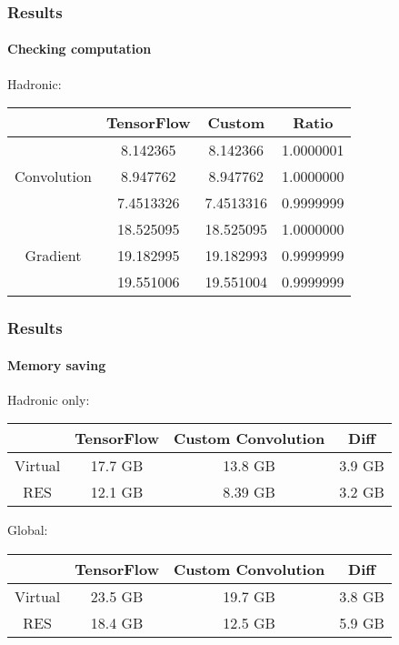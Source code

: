 \documentclass[aspectratio=43]{beamer}
\begin{document}
\begin{frame}

	\frametitle{Results}
	\framesubtitle{Checking computation}
	
	{\Large Hadronic:}
	\begin{table}
		\centering
		\begin{tabular}{c c c c}
			& TensorFlow & Custom & Ratio \\ \hline
			& 8.142365 & 8.142366 & {\color{darkgreen} 1.0000001} \\
			Convolution & 8.947762 & 8.947762 & {\color{darkgreen} 1.0000000} \\
			& 7.4513326 & 7.4513316 & {\color{darkgreen} 0.9999999} \\
			\hline
			& 18.525095 & 18.525095 & {\color{darkgreen} 1.0000000} \\
			Gradient & 19.182995 & 19.182993 & {\color{darkgreen} 0.9999999} \\
			& 19.551006 & 19.551004 & {\color{darkgreen} 0.9999999} \\
			\hline
		\end{tabular}
	\end{table}
	
\end{frame}

\begin{frame}

	\frametitle{Results}
	\framesubtitle{Memory saving}

	{\Large Hadronic only:}
	\begin{table}
		\centering
		\begin{tabular}{c c c c}
			& TensorFlow & Custom Convolution & Diff \\ \hline
			Virtual & {\color{red} 17.7 GB} & {\color{darkgreen} 13.8 GB} & {\color{darkgreen} 3.9 GB} \\
			RES & {\color{red} 12.1 GB} & {\color{darkgreen} 8.39 GB} & {\color{darkgreen} 3.2 GB} \\ \hline
		\end{tabular}
	\end{table}
	
	\hfill

	{\Large Global:}
	\begin{table}
		\centering
		\begin{tabular}{c c c c}
			& TensorFlow & Custom Convolution & Diff \\ \hline
			Virtual & {\color{red} 23.5 GB} & {\color{darkgreen} 19.7 GB} & {\color{darkgreen} 3.8 GB} \\
			RES & {\color{red} 18.4 GB} & {\color{darkgreen} 12.5 GB} & {\color{darkgreen} 5.9 GB} \\ \hline
		\end{tabular}
	\end{table}
	
\end{frame}
\end{document}
